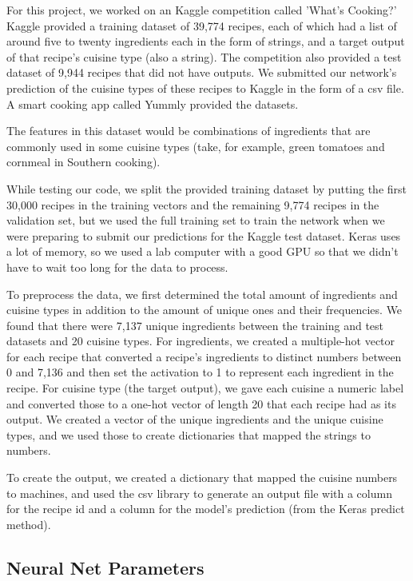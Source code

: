 \documentclass[11pt]{article}
\begin{document}
For this project, we worked on an Kaggle competition called 'What's Cooking?' Kaggle provided a training dataset of 39,774 recipes, each of which had a list of around five to twenty ingredients each in the form of strings, and a target output of that recipe's cuisine type (also a string). The competition also provided a test dataset of 9,944 recipes that did not have outputs. We submitted our network's prediction of the cuisine types of these recipes to Kaggle in the form of a csv file. A smart cooking app called Yummly provided the datasets. 

The features in this dataset would be combinations of ingredients that are commonly used in some cuisine types (take, for example, green tomatoes and cornmeal in Southern cooking). 

While testing our code, we split the provided training dataset by putting the first 30,000 recipes in the training vectors and the remaining 9,774 recipes in the validation set, but we used the full training set to train the network when we were preparing to submit our predictions for the Kaggle test dataset. Keras uses a lot of memory, so we used a lab computer with a good GPU so that we didn't have to wait too long for the data to process.

To preprocess the data, we first determined the total amount of ingredients and cuisine types in addition to the amount of unique ones and their frequencies. We found that there were 7,137 unique ingredients between the training and test datasets and 20 cuisine types. For ingredients, we created a multiple-hot vector for each recipe that converted a recipe's ingredients to distinct numbers between 0 and 7,136 and then set the activation to 1 to represent each ingredient in the recipe. For cuisine type (the target output), we gave each cuisine a numeric label and converted those to a one-hot vector of length 20 that each recipe had as its output. We created a vector of the unique ingredients and the unique cuisine types, and we used those to create dictionaries that mapped the strings to numbers. 

To create the output, we created a dictionary that mapped the cuisine numbers to machines, and used the csv library to generate an output file with a column for the recipe id and a column for the model's prediction (from the Keras predict method).


\subsection{Neural Net Parameters}
\end{document}
